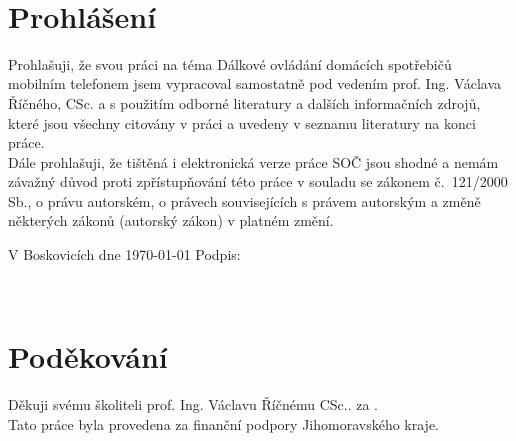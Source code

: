 \documentclass[12pt,a4paper,oneside]{article}
\begin{document}
\normalsize

\newpage

~ \vspace{88mm}

\section*{Prohlášení}

Prohlašuji, že svou práci na téma Dálkové ovládání domácích spotřebičů mobilním telefonem jsem vypracoval samostatně pod vedením prof. Ing. Václava Říčného, CSc. a s použitím odborné literatury a dalších informačních zdrojů, které jsou všechny citovány v práci a uvedeny v seznamu literatury na konci práce. \\
Dále prohlašuji, že tištěná i elektronická verze práce SOČ jsou shodné a nemám závažný důvod proti zpřístupňování této práce v souladu se zákonem č.~121/2000 Sb., o právu autorském, o právech souvisejících s právem autorským a změně některých zákonů (autorský zákon) v platném změní.

\vspace{16mm}

V Boskovicích dne \today \hspace{32mm} Podpis: 

\newpage

~ \vspace{72mm}

\section*{Poděkování}

Děkuji svému školiteli prof. Ing. Václavu Říčnému CSc.. za . \\
Tato práce byla provedena za finanční podpory Jihomoravského kraje.
\end{document}

